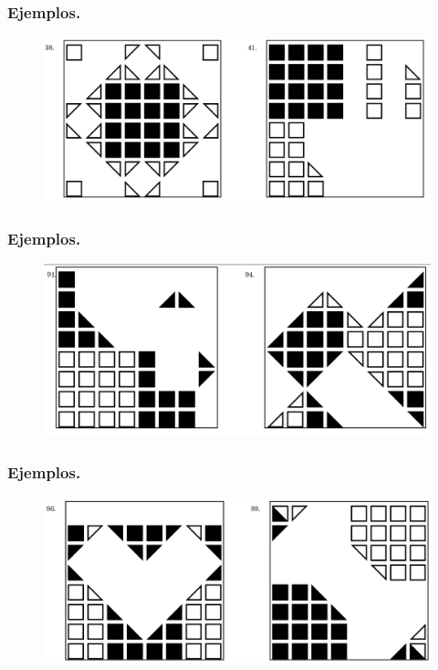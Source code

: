 \documentclass{beamer}
\begin{document}
\begin{frame}[t]
	\frametitle{Ejemplos.}
	\begin{figure}[hbtp!]\begin{overprint}
		\centering
		\includegraphics[width= \linewidth, page = 1]{IMAGENES/2_PROB/2/4}
	\end{overprint}
\end{figure}
\end{frame}

\begin{frame}[t]
	\frametitle{Ejemplos.}
	\begin{figure}[hbtp!]\begin{overprint}
		\centering
		\includegraphics[width= \linewidth, page = 1]{IMAGENES/2_PROB/2/5}
	\end{overprint}
\end{figure}
\end{frame}

\begin{frame}[t]
	\frametitle{Ejemplos.}
	\begin{figure}[hbtp!]\begin{overprint}
		\centering
		\includegraphics[width= \linewidth, page = 1]{IMAGENES/2_PROB/2/6}
	\end{overprint}
\end{figure}
\end{frame}
\end{document}
